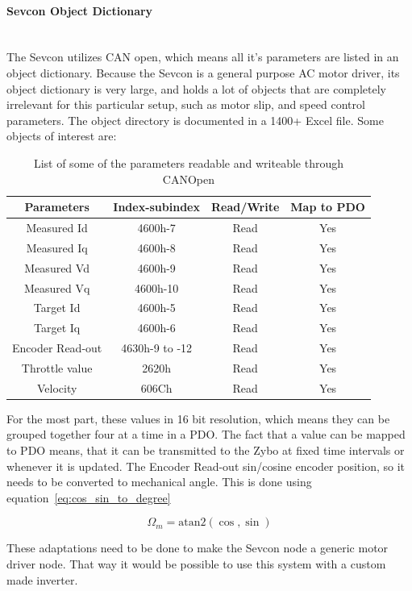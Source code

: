 \paragraph*{Sevcon Object Dictionary}\label{sub:sevcon_object_dictionary}~\\
The Sevcon utilizes CAN open, which means all it's parameters are listed in an object dictionary.
Because the Sevcon is a general purpose AC motor driver, its object dictionary is very large, and holds a lot of objects that are completely irrelevant for this particular setup, such as motor slip, and speed control parameters. 
The object directory is documented in a 1400+ Excel file. 
Some objects of interest are:

\begin{table}[h]
	\centering
	\begin{tabular}{| c | c | c | c |}
		\hline
		Parameters & Index-subindex & Read/Write & Map to PDO \\ %
		\hline
		Measured Id & 4600h-7 & Read & Yes \\ %
		Measured Iq & 4600h-8 & Read & Yes \\ %
		Measured Vd & 4600h-9 & Read & Yes \\ %
		Measured Vq & 4600h-10 & Read & Yes \\ %
		Target Id & 4600h-5 & Read & Yes \\ %
		Target Iq & 4600h-6 & Read & Yes \\ %
		Encoder Read-out & 4630h-9 to -12 & Read & Yes \\ %
		Throttle value & 2620h & Read & Yes \\ %
		Velocity & 606Ch & Read & Yes \\ %
		\hline	
	\end{tabular}
	\caption{List of some of the parameters readable and writeable through CANOpen}
	\label{tab:parameters_of_interest}
\end{table}

For the most part, these values in 16 bit resolution, which means they can be grouped together four at a time in a PDO.
The fact that a value can be mapped to PDO means, that it can be transmitted to the Zybo at fixed time intervals or whenever it is updated.
The Encoder Read-out sin/cosine encoder position, so it needs to be converted to mechanical angle. 
This is done using equation~\ref{eq:cos_sin_to_degree}

\begin{equation}
\Omega_m = \mathrm{atan2}(\cos,\sin)
\label{eq:cos_sin_to_degree}
\end{equation}

These adaptations need to be done to make the Sevcon node a generic motor driver node.
That way it would be possible to use this system with a custom made inverter.
